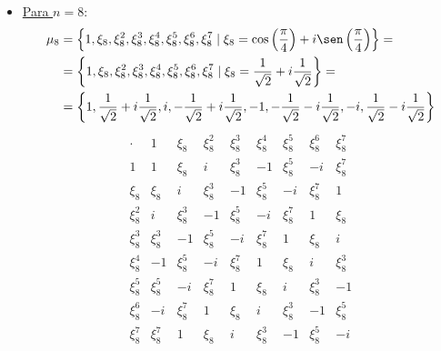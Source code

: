 \begin{ejercicio}
\begin{itemize}
        \item \ul{Para $n = 8$}:
        \begin{align*}
            \mu_8 &= \left\{1, \xi_8, \xi_8^2, \xi_8^3, \xi_8^4, \xi_8^5, \xi_8^6, \xi_8^7 \mid \xi_8 = \cos\left(\frac{\pi}{4}\right) + i\sen\left(\frac{\pi}{4}\right)\right\}
            =\\&= \left\{1, \xi_8, \xi_8^2, \xi_8^3, \xi_8^4, \xi_8^5, \xi_8^6, \xi_8^7 \mid \xi_8 = \frac{1}{\sqrt{2}} + i\frac{1}{\sqrt{2}}\right\}
            =\\&= \left\{1, \frac{1}{\sqrt{2}} + i\frac{1}{\sqrt{2}}, i, -\frac{1}{\sqrt{2}} + i\frac{1}{\sqrt{2}}, -1, -\frac{1}{\sqrt{2}} - i\frac{1}{\sqrt{2}}, -i, \frac{1}{\sqrt{2}} - i\frac{1}{\sqrt{2}}\right\}
        \end{align*}
        \begin{equation*}
            \begin{array}{c|cccccccc}
                \cdot & 1 & \xi_8 & \xi_8^2 & \xi_8^3 & \xi_8^4 & \xi_8^5 & \xi_8^6 & \xi_8^7 \\ \hline
                1 & 1 & \xi_8 & i & \xi_8^3 & -1 & \xi_8^5 & -i & \xi_8^7 \\
                \xi_8 & \xi_8 & i & \xi_8^3 & -1 & \xi_8^5 & -i & \xi_8^7 & 1 \\
                \xi_8^2 & i & \xi_8^3 & -1 & \xi_8^5 & -i & \xi_8^7 & 1 & \xi_8 \\
                \xi_8^3 & \xi_8^3 & -1 & \xi_8^5 & -i & \xi_8^7 & 1 & \xi_8 & i \\
                \xi_8^4 & -1 & \xi_8^5 & -i & \xi_8^7 & 1 & \xi_8 & i & \xi_8^3 \\
                \xi_8^5 & \xi_8^5 & -i & \xi_8^7 & 1 & \xi_8 & i & \xi_8^3 & -1 \\
                \xi_8^6 & -i & \xi_8^7 & 1 & \xi_8 & i & \xi_8^3 & -1 & \xi_8^5 \\
                \xi_8^7 & \xi_8^7 & 1 & \xi_8 & i & \xi_8^3 & -1 & \xi_8^5 & -i
            \end{array}
        \end{equation*}
    \end{itemize}
\end{ejercicio}


